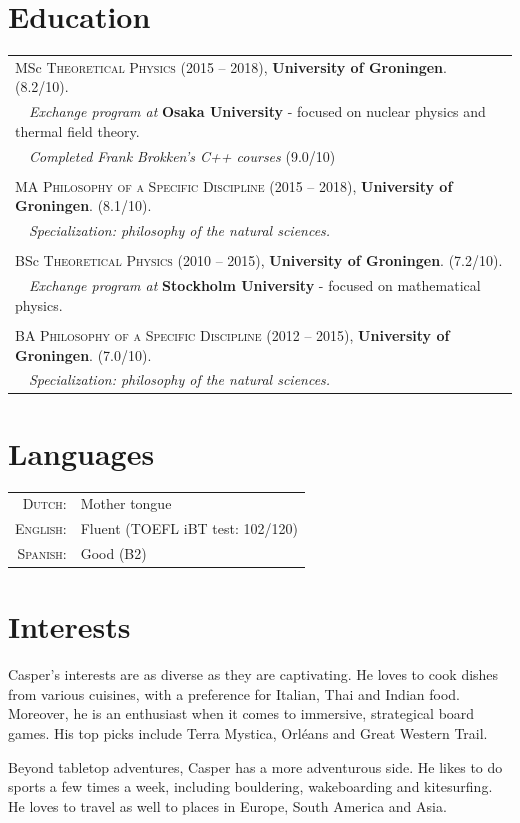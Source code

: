 \documentclass[a4paper,8pt]{article}
\begin{document}
\section{Education}
\begin{tabular}{l}
MSc \textsc{Theoretical Physics} (2015 -- 2018), \textbf{University of Groningen}. (8.2/10).\\
\ \ \textit{Exchange program at} \textbf{Osaka University} - focused on nuclear physics and thermal field theory. \\
\ \ \textit{Completed Frank Brokken's C++ courses} (9.0/10)
\\ \\
 MA \textsc{Philosophy of a Specific Discipline} (2015 -- 2018),
\textbf{University of Groningen}. (8.1/10). \\ 
\ \ \textit{Specialization: philosophy of the natural sciences.}
\\ \\
 BSc \textsc{Theoretical Physics} (2010 --  2015), \textbf{University of Groningen}. (7.2/10).\\ 
\ \ \textit{Exchange program at} \textbf{Stockholm University} - focused on mathematical physics. \\
 \\
 BA \textsc{Philosophy of a Specific Discipline} (2012 --  2015), \textbf{University of Groningen}. (7.0/10). \\
\ \  \textit{Specialization: philosophy of the natural sciences.}
\end{tabular}

\section{Languages}
\begin{tabular}{rl}
 \textsc{Dutch:}&Mother tongue\\
\textsc{English:}&Fluent (TOEFL iBT test: 102/120)\\
\textsc{Spanish:}&Good (B2)\\
\end{tabular}


\section{Interests}
Casper's interests are as diverse as they are captivating. He loves to cook dishes from various cuisines, with a preference for Italian, Thai and Indian food. Moreover, he is an enthusiast when it comes to immersive, strategical board games. His top picks include Terra Mystica, Orléans and Great Western Trail.

Beyond tabletop adventures, Casper has a more adventurous side. He likes to do sports a few times a week, including bouldering, wakeboarding and kitesurfing. He loves to travel as well to places in Europe, South America and Asia.
\end{document}
